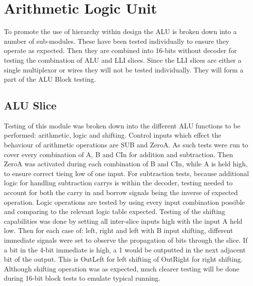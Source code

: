 
\section{Arithmetic Logic Unit}
To promote the use of hierarchy within design the ALU is broken down into a number of sub-modules. 
These have been tested individually to ensure they operate as expected. 
Then they are combined into 16-bits without decoder for testing the combination of ALU and LLI slices. 
Since the LLI slices are either a single multiplexor or wires they will not be tested individually. 
They will form a part of the ALU Block testing. 

\subsection{ALU Slice}
Testing of this module was broken down into the different ALU functions to be performed: arithmetic, logic and shifting. Control inputs which effect the behaviour of arithmetic operations are SUB and ZeroA. As such tests were run to cover every combination of A, B and CIn for addition and subtraction. Then ZeroA was activated during each combination of B and CIn, while A is held high, to ensure correct tieing low of one input. 
For subtraction tests, because additional logic for handling subtraction carrys is within the decoder, testing needed to account for both the carry in and borrow signals being the inverse of expected operation.
Logic operations are tested by using every input combination possible and comparing to the relevant logic table expected.
Testing of the shifting capabilities was done by setting all inter-slice inputs high with the input A held low. Then for each case of: left, right and left with B input shifting, different immediate signals were set to observe the propagation of bits through the slice. If a bit in the 4-bit immediate is high, a 1 would be outputted in the next adjacent bit of the output. This is OutLeft for left shifting of OutRight for right shifting.
Although shifting operation was as expected, much clearer testing will be done during 16-bit block tests to emulate typical running. 

